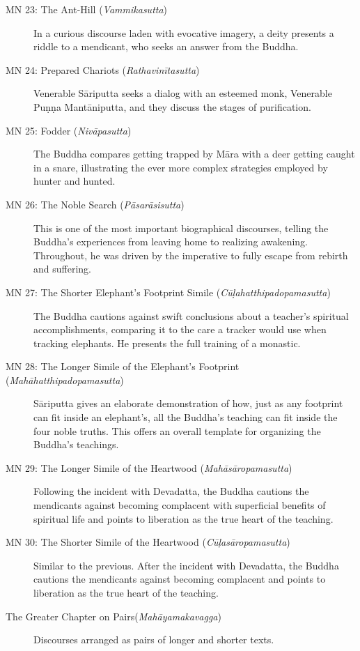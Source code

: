 \documentclass[12pt,openany]{book}%
\begin{document}
\begin{description}
\item[MN 23: The Ant-Hill (\textit{\textsanskrit{Vammikasutta}})] In a curious discourse laden with evocative imagery, a deity presents a riddle to a mendicant, who seeks an answer from the Buddha.%
\item[MN 24: Prepared Chariots (\textit{\textsanskrit{Rathavinītasutta}})] Venerable \textsanskrit{Sāriputta} seeks a dialog with an esteemed monk, Venerable \textsanskrit{Puṇṇa} \textsanskrit{Mantāniputta}, and they discuss the stages of purification.%
\item[MN 25: Fodder (\textit{\textsanskrit{Nivāpasutta}})] The Buddha compares getting trapped by \textsanskrit{Māra} with a deer getting caught in a snare, illustrating the ever more complex strategies employed by hunter and hunted.%
\item[MN 26: The Noble Search (\textit{\textsanskrit{Pāsarāsisutta}})] This is one of the most important biographical discourses, telling the Buddha’s experiences from leaving home to realizing awakening. Throughout, he was driven by the imperative to fully escape from rebirth and suffering.%
\item[MN 27: The Shorter Elephant’s Footprint Simile (\textit{\textsanskrit{Cūḷahatthipadopamasutta}})] The Buddha cautions against swift conclusions about a teacher’s spiritual accomplishments, comparing it to the care a tracker would use when tracking elephants. He presents the full training of a monastic.%
\item[MN 28: The Longer Simile of the Elephant’s Footprint (\textit{\textsanskrit{Mahāhatthipadopamasutta}})] \textsanskrit{Sāriputta} gives an elaborate demonstration of how, just as any footprint can fit inside an elephant’s, all the Buddha’s teaching can fit inside the four noble truths. This offers an overall template for organizing the Buddha’s teachings.%
\item[MN 29: The Longer Simile of the Heartwood (\textit{\textsanskrit{Mahāsāropamasutta}})] Following the incident with Devadatta, the Buddha cautions the mendicants against becoming complacent with superficial benefits of spiritual life and points to liberation as the true heart of the teaching.%
\item[MN 30: The Shorter Simile of the Heartwood (\textit{\textsanskrit{Cūḷasāropamasutta}})] Similar to the previous. After the incident with Devadatta, the Buddha cautions the mendicants against becoming complacent and points to liberation as the true heart of the teaching.%
\item[The Greater Chapter on Pairs(\textit{\textsanskrit{Mahāyamakavagga}})] Discourses arranged as pairs of longer and shorter texts.%

\end{description}
\end{document}
